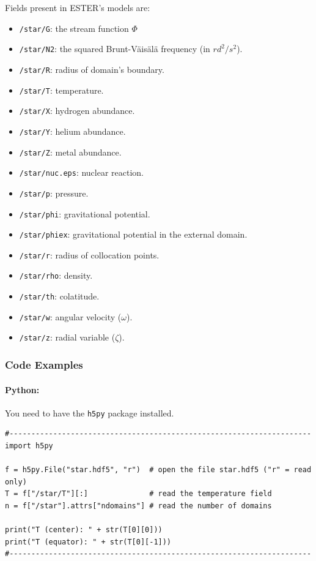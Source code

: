 Fields present in ESTER's models are: 
\begin{itemize}
    \item \texttt{/star/G}: the stream function $\Phi$
    \item \texttt{/star/N2}: the squared Brunt-Väisälä frequency (in $rd^2 /s^2$).
    \item \texttt{/star/R}: radius of domain's boundary.
    \item \texttt{/star/T}: temperature.
    \item \texttt{/star/X}: hydrogen abundance.
    \item \texttt{/star/Y}: helium abundance.
    \item \texttt{/star/Z}: metal abundance.
    \item \texttt{/star/nuc.eps}: nuclear reaction.
    \item \texttt{/star/p}: pressure.
    \item \texttt{/star/phi}: gravitational potential.
    \item \texttt{/star/phiex}: gravitational potential in the external domain.
    \item \texttt{/star/r}: radius of collocation points.
    \item \texttt{/star/rho}: density.
    \item \texttt{/star/th}: colatitude.
    \item \texttt{/star/w}: angular velocity ($\omega$).
    \item \texttt{/star/z}: radial variable ($\zeta$).
\end{itemize}

\subsubsection{Code Examples}

\paragraph{Python:}
You need to have the \texttt{h5py} package installed. 

\begin{verbatim}
#---------------------------------------------------------------------
import h5py

f = h5py.File("star.hdf5", "r")  # open the file star.hdf5 ("r" = read only)
T = f["/star/T"][:]              # read the temperature field
n = f["/star"].attrs["ndomains"] # read the number of domains

print("T (center): " + str(T[0][0]))
print("T (equator): " + str(T[0][-1]))
#---------------------------------------------------------------------
\end{verbatim}

